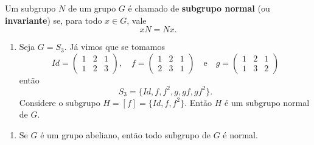 \documentclass{beamer}
\begin{document}
    \begin{frame}
        \begin{definicao}
            Um subgrupo $N$ de um grupo $G$ é chamado de \textbf{subgrupo normal} (ou \textbf{invariante}) se, para todo $x \in G$, vale
            \[
                xN = Nx.
            \]
        \end{definicao}
    \end{frame}

    \begin{frame}
        \begin{exemplos}
            \begin{enumerate}[label=({\arabic*})]
                \item Seja $G = S_3$. Já vimos que se tomamos
                \[
                    Id = \begin{pmatrix}
                        1 & 2 & 1\\
                        1 & 2 & 3
                    \end{pmatrix},\quad
                    f = \begin{pmatrix}
                        1 & 2 & 1\\
                        2 & 3 & 1
                    \end{pmatrix} \quad \mbox{e}\quad
                    g = \begin{pmatrix}
                        1 & 2 & 1\\
                        1 & 3 & 2
                    \end{pmatrix}
                \]
                então
                \[
                    S_3 = \{Id, f, f^2, g, gf, gf^2\}.
                \]
                Considere o subgrupo $H = [f] = \{Id, f, f^2\}$. Então $H$ é um subgrupo normal de $G$.

                \seti
            \end{enumerate}
        \end{exemplos}
    \end{frame}

    \begin{frame}
        \begin{exemplos}
            \begin{enumerate}[label=({\arabic*})]
                \seti

                \item Se $G$ é um grupo abeliano, então todo subgrupo de $G$ é normal.
                
                \conti
            \end{enumerate}
        \end{exemplos}
    \end{frame}
\end{document}
